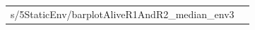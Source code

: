 \documentclass[a4paper,10pt]{article}
\begin{document}
\begin{table}[H]
\begin{tabular}{cc}
s/5StaticEnv/barplotAliveR1AndR2_median_env3}\\

\end{tabular}
\end{table}
\end{document}
